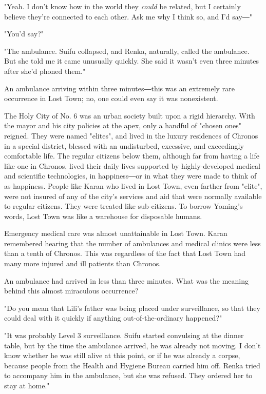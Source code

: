 "Yeah. I don't know how in the world they \emph{could} be related, but I
certainly believe they're connected to each other. Ask me why I think
so, and I'd say―"

"You'd say?"

"The ambulance. Suifu collapsed, and Renka, naturally, called the
ambulance. But she told me it came unusually quickly. She said it wasn't
even three minutes after she'd phoned them."

An ambulance arriving within three minutes―this was an extremely rare
occurrence in Lost Town; no, one could even say it was nonexistent.

The Holy City of No. 6 was an urban society built upon a rigid
hierarchy. With the mayor and his city policies at the apex, only a
handful of "chosen ones" reigned. They were named "elites", and lived in
the luxury residences of Chronos in a special district, blessed with an
undisturbed, excessive, and exceedingly comfortable life. The regular
citizens below them, although far from having a life like one in
Chronos, lived their daily lives supported by highly-developed medical
and scientific technologies, in happiness―or in what they were made to
think of as happiness. People like Karan who lived in Lost Town, even
farther from "elite", were not insured of any of the city's services and
aid that were normally available to regular citizens. They were treated
like sub-citizens. To borrow Yoming's words, Lost Town was like a
warehouse for disposable humans.

Emergency medical care was almost unattainable in Lost Town. Karan
remembered hearing that the number of ambulances and medical clinics
were less than a tenth of Chronos. This was regardless of the fact that
Lost Town had many more injured and ill patients than Chronos.

An ambulance had arrived in less than three minutes. What was the
meaning behind this almost miraculous occurrence?

"Do you mean that Lili's father was being placed under surveillance, so
that they could deal with it quickly if anything out-of-the-ordinary
happened?"

"It was probably Level 3 surveillance. Suifu started convulsing at the
dinner table, but by the time the ambulance arrived, he was already not
moving. I don't know whether he was still alive at this point, or if he
was already a corpse, because people from the Health and Hygiene Bureau
carried him off. Renka tried to accompany him in the ambulance, but she
was refused. They ordered her to stay at home."

